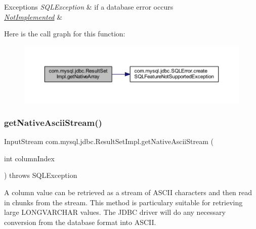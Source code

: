 \begin{DoxyExceptions}{Exceptions}
{\em S\+Q\+L\+Exception} & if a database error occurs \\
\hline
{\em \mbox{\hyperlink{classcom_1_1mysql_1_1jdbc_1_1_not_implemented}{Not\+Implemented}}} & \\
\hline
\end{DoxyExceptions}
Here is the call graph for this function\+:
\nopagebreak
\begin{figure}[H]
\begin{center}
\leavevmode
\includegraphics[width=350pt]{classcom_1_1mysql_1_1jdbc_1_1_result_set_impl_a76b1a9c9433c919ed45a65c8ace0705f_cgraph}
\end{center}
\end{figure}
\mbox{\label{classcom_1_1mysql_1_1jdbc_1_1_result_set_impl_a25a66bda18485aa6fb3891ba594b8c57}} 
\subsubsection{\texorpdfstring{get\+Native\+Ascii\+Stream()}{getNativeAsciiStream()}}
{\footnotesize\ttfamily Input\+Stream com.\+mysql.\+jdbc.\+Result\+Set\+Impl.\+get\+Native\+Ascii\+Stream (\begin{DoxyParamCaption}\item[{int}]{column\+Index }\end{DoxyParamCaption}) throws S\+Q\+L\+Exception\hspace{0.3cm}{\ttfamily [protected]}}

A column value can be retrieved as a stream of A\+S\+C\+II characters and then read in chunks from the stream. This method is particulary suitable for retrieving large L\+O\+N\+G\+V\+A\+R\+C\+H\+AR values. The J\+D\+BC driver will do any necessary conversion from the database format into A\+S\+C\+II.

